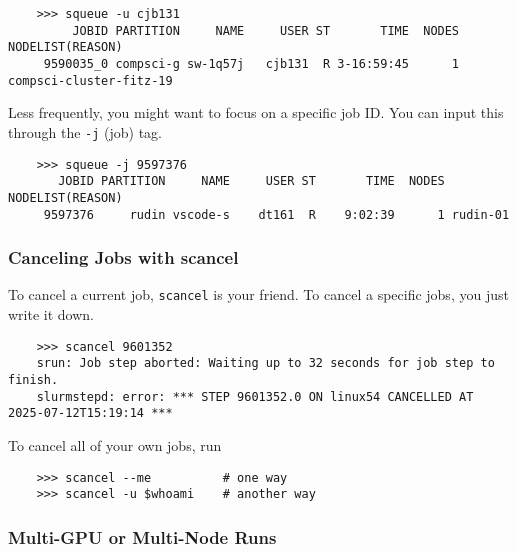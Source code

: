   \begin{lstlisting}
    >>> squeue -u cjb131
         JOBID PARTITION     NAME     USER ST       TIME  NODES NODELIST(REASON)
     9590035_0 compsci-g sw-1q57j   cjb131  R 3-16:59:45      1 compsci-cluster-fitz-19 
  \end{lstlisting} 

  Less frequently, you might want to focus on a specific job ID. You can input this through the \texttt{-j} (job) tag. 

  \begin{lstlisting}
    >>> squeue -j 9597376
       JOBID PARTITION     NAME     USER ST       TIME  NODES NODELIST(REASON)
     9597376     rudin vscode-s    dt161  R    9:02:39      1 rudin-01 
  \end{lstlisting}
  
\subsubsection{Canceling Jobs with scancel}

  To cancel a current job, \texttt{scancel} is your friend. To cancel a specific jobs, you just write it down. 

  \begin{lstlisting}
    >>> scancel 9601352   
    srun: Job step aborted: Waiting up to 32 seconds for job step to finish.
    slurmstepd: error: *** STEP 9601352.0 ON linux54 CANCELLED AT 2025-07-12T15:19:14 ***   
  \end{lstlisting}

  To cancel all of your own jobs, run 
  \begin{lstlisting}
    >>> scancel --me          # one way
    >>> scancel -u $whoami    # another way
  \end{lstlisting} 

\subsubsection{Multi-GPU or Multi-Node Runs}
